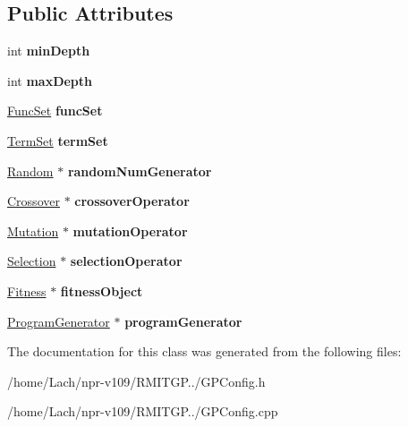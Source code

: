 \subsection*{Public Attributes}
\begin{DoxyCompactItemize}
\item 
\hypertarget{classGPConfig_a2f3cd90e27adbd9b268e5e971ea307a1}{}\label{classGPConfig_a2f3cd90e27adbd9b268e5e971ea307a1} 
int {\bfseries min\+Depth}
\item 
\hypertarget{classGPConfig_aa303ff5961d10678cf9a7450e86c865c}{}\label{classGPConfig_aa303ff5961d10678cf9a7450e86c865c} 
int {\bfseries max\+Depth}
\item 
\hypertarget{classGPConfig_a6e87e49e9df1a1099bd90841cc5007e4}{}\label{classGPConfig_a6e87e49e9df1a1099bd90841cc5007e4} 
\hyperlink{classFuncSet}{Func\+Set} {\bfseries func\+Set}
\item 
\hypertarget{classGPConfig_a0c61334e69d034e4dfa98c04703e7964}{}\label{classGPConfig_a0c61334e69d034e4dfa98c04703e7964} 
\hyperlink{classTermSet}{Term\+Set} {\bfseries term\+Set}
\item 
\hypertarget{classGPConfig_acf1e34811aefbf81986a0eb100fa05fd}{}\label{classGPConfig_acf1e34811aefbf81986a0eb100fa05fd} 
\hyperlink{classRandom}{Random} $\ast$ {\bfseries random\+Num\+Generator}
\item 
\hypertarget{classGPConfig_a29e9edd7b124a56391efc247ec0b5993}{}\label{classGPConfig_a29e9edd7b124a56391efc247ec0b5993} 
\hyperlink{classCrossover}{Crossover} $\ast$ {\bfseries crossover\+Operator}
\item 
\hypertarget{classGPConfig_a59f07ecbd6c5bef5747ff7b0d8df7d34}{}\label{classGPConfig_a59f07ecbd6c5bef5747ff7b0d8df7d34} 
\hyperlink{classMutation}{Mutation} $\ast$ {\bfseries mutation\+Operator}
\item 
\hypertarget{classGPConfig_a9c959060158716312a82be4a6ee4ed8f}{}\label{classGPConfig_a9c959060158716312a82be4a6ee4ed8f} 
\hyperlink{classSelection}{Selection} $\ast$ {\bfseries selection\+Operator}
\item 
\hypertarget{classGPConfig_a805803520f30f53973703b0c3cd56906}{}\label{classGPConfig_a805803520f30f53973703b0c3cd56906} 
\hyperlink{classFitness}{Fitness} $\ast$ {\bfseries fitness\+Object}
\item 
\hypertarget{classGPConfig_aad657d4dcb34731371624dc2f2ad04cb}{}\label{classGPConfig_aad657d4dcb34731371624dc2f2ad04cb} 
\hyperlink{classProgramGenerator}{Program\+Generator} $\ast$ {\bfseries program\+Generator}
\end{DoxyCompactItemize}


The documentation for this class was generated from the following files\+:\begin{DoxyCompactItemize}
\item 
/home/\+Lach/npr-\/v109/\+R\+M\+I\+T\+G\+P../G\+P\+Config.\+h\item 
/home/\+Lach/npr-\/v109/\+R\+M\+I\+T\+G\+P../G\+P\+Config.\+cpp\end{DoxyCompactItemize}
